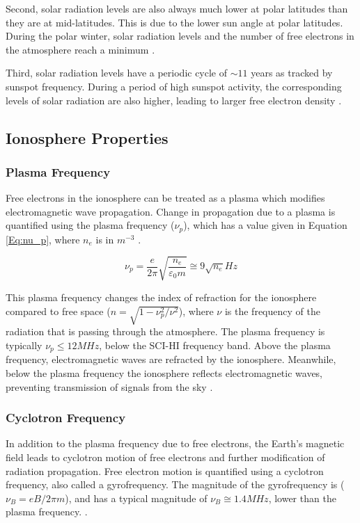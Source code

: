 Second, solar radiation levels are also always much lower at polar latitudes than they are at mid-latitudes. This is due to the lower sun angle at polar latitudes. During the polar winter, solar radiation levels and the number of free electrons in the atmosphere reach a minimum \cite{ionospheres}. 

Third, solar radiation levels have a periodic cycle of $\sim 11$ years as tracked by sunspot frequency. During a period of high sunspot activity, the corresponding levels of solar radiation are also higher, leading to larger free electron density \cite{ionospheres}. 


\subsection{Ionosphere Properties}

\subsubsection{Plasma Frequency}

Free electrons in the ionosphere can be treated as a plasma which modifies electromagnetic wave propagation. Change in propagation due to a plasma is quantified using the plasma frequency ($\nu_p$), which has a value given in Equation \ref{Eq:nu_p}, where $n_e$ is in $m^{-3}$ \cite{thompson_2001}. 

\begin{equation} \label{Eq:nu_p}
\nu_p = \frac{e}{2 \pi} \sqrt{\frac{n_e}{\varepsilon_0 m}} \cong 9 \sqrt{n_e} Hz
\end{equation}

This plasma frequency changes the index of refraction for the ionosphere compared to free space ($n = \sqrt{1-\nu_p^2/\nu^2}$), where $\nu$ is the frequency of the radiation that is passing through the atmosphere. The plasma frequency is typically $\nu_p \leq 12 MHz$, below the SCI-HI frequency band. Above the plasma frequency, electromagnetic waves are refracted by the ionosphere. Meanwhile, below the plasma frequency the ionosphere reflects electromagnetic waves, preventing transmission of signals from the sky \cite{thompson_2001}. 

\subsubsection{Cyclotron Frequency}

In addition to the plasma frequency due to free electrons, the Earth's magnetic field leads to cyclotron motion of free electrons and further modification of radiation propagation. Free electron motion is quantified using a cyclotron frequency, also called a gyrofrequency. The magnitude of the gyrofrequency is ($\nu_B = eB/2 \pi m$), and has a typical magnitude of $\nu_B \cong 1.4 MHz$, lower than the plasma frequency. \cite{thompson_2001}. 

